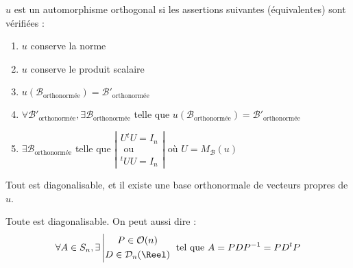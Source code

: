 \documentclass[11pt,a4paper,fleqn,pdftex]{report}
\begin{document}
\begin{theorem}
    $u$ est un automorphisme orthogonal si les assertions suivantes (équivalentes) sont vérifiées :
    \renewcommand{\theenumi}{\roman{enumi}}%
    \begin{enumerate}
        \item $u$ conserve la norme
        \item $u$ conserve le produit scalaire
        \item $u\left(\mathcal{B}_\text{orthonormée}\right) = \mathcal{B}'_\text{orthonormée}$
        \item $\forall \mathcal{B'}_\text{orthonormée}, \exists \mathcal{B}_\text{orthonormée}$ telle que $u\left(\mathcal{B}_\text{orthonormée}\right) = \mathcal{B}'_\text{orthonormée}$
        \item $\exists \mathcal{B}_\text{orthonormée} $ telle que $\left| \begin{gathered}
            U{}^tU = I_n\\
            \text{ ou }\\
            {}^tUU = I_n
        \end{gathered}\right|$ où $U = M_\mathcal{B}(u)$
    \end{enumerate}
\end{theorem}
\begin{itheorem}
    Tout  est diagonalisable, et il existe une base orthonormale de vecteurs propres de $u$.\par

    Toute  est diagonalisable. On peut aussi dire : 
    \begin{equation}
    \forall A \in S_n, \exists  \left| \begin{gathered} P \in \mathcal{O}(n) \\ D \in \mathcal{D}_n(\Reel) \end{gathered} \right. \text{ tel que } A = PDP^{-1} = PD{}^tP
    \end{equation}
\end{itheorem}
\end{document}
